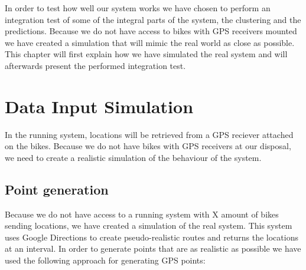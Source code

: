 In order to test how well our system works we have chosen to perform an integration test of some of the integral parts of the system, the clustering and the predictions.
Because we do not have access to bikes with GPS receivers mounted we have created a simulation that will mimic the real world as close as possible.
This chapter will first explain how we have simulated the real system and will afterwards present the performed integration test.

\section{Data Input Simulation}\label{design:datasimulation}
In the running system, locations will be retrieved from a GPS reciever attached on the bikes.
Because we do not have bikes with GPS receivers at our disposal, we need to create a realistic simulation of the behaviour of the system.

\subsection{Point generation}
Because we do not have access to a running system with X amount of bikes sending locations, we have created a simulation of the real system.
This system uses Google Directions to create pseudo-realistic routes and returns the locations at an interval.
In order to generate points that are as realistic as possible we have used the following approach for generating GPS points:


